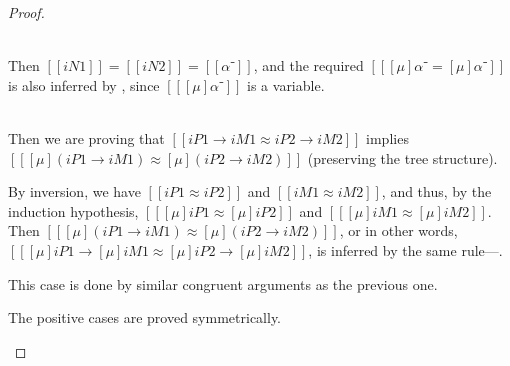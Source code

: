 \begin{proof}
\begin{caseof}
    \item {}\\
      Then $[[iN1]] = [[iN2]] = [[α⁻]]$, and the required
      $[[ [μ]α⁻ = [μ]α⁻ ]]$ is also inferred by
      , since 
      $[[ [μ]α⁻ ]]$ is a variable.
    \item {}\\
      Then we are proving 
      that $[[iP1 → iM1 ≈ iP2 → iM2]]$ implies
      $[[ [μ](iP1 → iM1) ≈ [μ](iP2 → iM2) ]]$ 
      (preserving the tree structure).

      By inversion, we have $[[iP1 ≈ iP2]]$ and $[[iM1 ≈ iM2]]$,
      and thus, by the induction hypothesis,
      $[[ [μ]iP1 ≈ [μ]iP2 ]]$ and $[[ [μ]iM1 ≈ [μ]iM2 ]]$.
      Then $[[ [μ](iP1 → iM1) ≈ [μ](iP2 → iM2) ]]$, 
      or in other words, $[[ [μ]iP1 → [μ]iM1 ≈ [μ]iP2 → [μ]iM2 ]]$,
      is inferred by the same rule---.
    \item {}
      This case is done by similar congruent arguments as
      the previous one.
    \item The positive cases are proved symmetrically.
    \end{caseof}
\end{proof}


